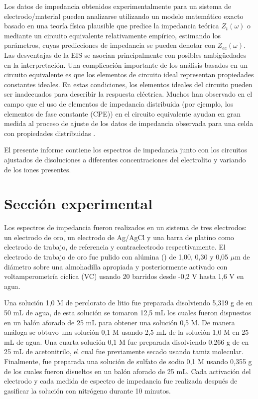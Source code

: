 \documentclass[fleqn,11pt]{SelfArx}
\begin{document}
	Los datos de impedancia obtenidos experimentalmente para un sistema de electrodo/material pueden analizarse utilizando un modelo matemático exacto basado en una teoría física plausible que predice la impedancia teórica $Z_t(\omega)$ o mediante un circuito equivalente relativamente empírico, estimando los parámetros, cuyas predicciones de impedancia se pueden denotar con $Z_{ec}(\omega)$. Las desventajas de la EIS se asocian principalmente con posibles ambigüedades en la interpretación. Una complicación importante de los análisis basados en un circuito equivalente es que los elementos de circuito ideal representan propiedades constantes ideales. En estas condiciones, los elementos ideales del circuito pueden ser inadecuados para describir la respuesta eléctrica. Muchos han observado en el campo que el uso de elementos de impedancia distribuida (por ejemplo, los elementos de fase constante (CPE)) en el circuito equivalente ayudan en gran medida al proceso de ajuste de los datos de impedancia observada para una celda con propiedades distribuidas \cite{macdonald2005impedance}.

	El presente informe contiene los espectros de impedancia junto con los circuitos ajustados de disoluciones a diferentes concentraciones del electrolito y variando de los iones presentes.
	
	
	\section{Secci\'on experimental}
	Los espectros de impedancia fueron realizados en un sistema de tres electrodos: un electrodo de oro, un electrodo de Ag/AgCl y una barra de platino como electrodo de trabajo, de referencia y contraelectrodo respectivamente. El electrodo de trabajo de oro fue pulido con al\'umina () de 1,00, 0,30 y 0,05 $\mu$m de diámetro sobre una almohadilla apropiada y posteriormente activado con voltamperometría cíclica (VC) usando 20 barridos desde -0,2 V hasta 1,6 V en agua. 
	
	Una solución 1,0 M de perclorato de litio fue preparada disolviendo 5,319 g de  en 50 mL de agua, de esta solución se tomaron 12,5 mL los cuales fueron dispuestos en un balón aforado de 25 mL para obtener una solución 0,5 M. De manera análoga se obtuvo una solución 0,1 M usando 2,5 mL de la solución 1,0 M en 25 mL de agua. Una cuarta solución 0,1 M fue preparada disolviendo 0.266 g de  en 25 mL de acetonitrilo, el cual fue previamente secado usando tamiz molecular. Finalmente, fue preparada una solución de sulfato de sodio 0,1 M usando 0,355 g de  los cuales fueron disueltos en un balón aforado de 25 mL. Cada activación del electrodo y cada medida de espectro de impedancia fue realizada después de gasificar la solución con nitrógeno durante 10 minutos.
	
\end{document}
